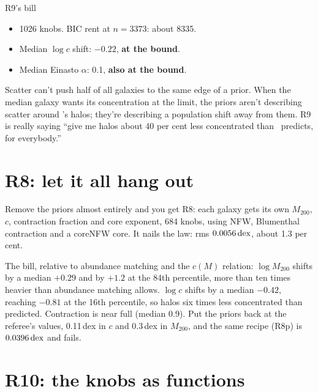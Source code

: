 \begin{knobbox}{R9's bill}
\begin{itemize}
\item 1026 knobs. BIC rent at $n=3373$: about 8335.
\item Median $\log c$ shift: $-0.22$, \textbf{at the bound}.
\item Median Einasto $\alpha$: 0.1, \textbf{also at the bound}.
\end{itemize}
Scatter can't push half of all galaxies to the same edge of a prior. When the median galaxy wants its concentration at the limit, the priors aren't describing scatter around \LCDM's halos; they're describing a population shift away from them. R9 is really saying ``give me halos about 40 per cent less concentrated than \LCDM\ predicts, for everybody.''
\end{knobbox}

\section{R8: let it all hang out}

Remove the priors almost entirely and you get R8: each galaxy gets its own $M_{200}$, $c$, contraction fraction and core exponent, 684 knobs, using NFW, Blumenthal contraction and a coreNFW core. It nails the law: rms $0.0056\,\mathrm{dex}$, about 1.3 per cent.

The bill, relative to abundance matching and the $c(M)$ relation: $\log M_{200}$ shifts by a median $+0.29$ and by $+1.2$ at the 84th percentile, more than ten times heavier than abundance matching allows. $\log c$ shifts by a median $-0.42$, reaching $-0.81$ at the 16th percentile, so halos six times less concentrated than predicted. Contraction is near full (median 0.9). Put the priors back at the referee's values, 0.11\,dex in $c$ and 0.3\,dex in $M_{200}$, and the same recipe (R8p) is $0.0396\,\mathrm{dex}$ and fails.



\section{R10: the knobs as functions}

